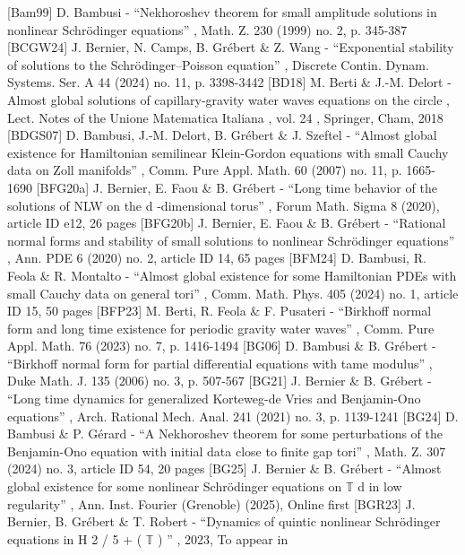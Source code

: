  [Bam99] D. Bambusi - “Nekhoroshev theorem for small amplitude solutions in nonlinear Schrödinger equations” , Math. Z. 230 (1999) no. 2, p. 345-387
 [BCGW24] J. Bernier, N. Camps, B. Grébert \& Z. Wang - “Exponential stability of solutions to the Schrödinger–Poisson equation” , Discrete Contin. Dynam. Systems. Ser. A 44 (2024) no. 11, p. 3398-3442
 [BD18] M. Berti \& J.-M. Delort - Almost global solutions of capillary-gravity water waves equations on the circle , Lect. Notes of the Unione Matematica Italiana , vol. 24 , Springer, Cham, 2018
 [BDGS07] D. Bambusi, J.-M. Delort, B. Grébert \& J. Szeftel - “Almost global existence for Hamiltonian semilinear Klein-Gordon equations with small Cauchy data on Zoll manifolds” , Comm. Pure Appl. Math. 60 (2007) no. 11, p. 1665-1690
 [BFG20a] J. Bernier, E. Faou \& B. Grébert - “Long time behavior of the solutions of NLW on the d -dimensional torus” , Forum Math. Sigma 8 (2020), article ID e12, 26 pages
 [BFG20b] J. Bernier, E. Faou \& B. Grébert - “Rational normal forms and stability of small solutions to nonlinear Schrödinger equations” , Ann. PDE 6 (2020) no. 2, article ID 14, 65 pages
 [BFM24] D. Bambusi, R. Feola \& R. Montalto - “Almost global existence for some Hamiltonian PDEs with small Cauchy data on general tori” , Comm. Math. Phys. 405 (2024) no. 1, article ID 15, 50 pages
 [BFP23] M. Berti, R. Feola \& F. Pusateri - “Birkhoff normal form and long time existence for periodic gravity water waves” , Comm. Pure Appl. Math. 76 (2023) no. 7, p. 1416-1494
 [BG06] D. Bambusi \& B. Grébert - “Birkhoff normal form for partial differential equations with tame modulus” , Duke Math. J. 135 (2006) no. 3, p. 507-567
 [BG21] J. Bernier \& B. Grébert - “Long time dynamics for generalized Korteweg-de Vries and Benjamin-Ono equations” , Arch. Rational Mech. Anal. 241 (2021) no. 3, p. 1139-1241
 [BG24] D. Bambusi \& P. Gérard - “A Nekhoroshev theorem for some perturbations of the Benjamin-Ono equation with initial data close to finite gap tori” , Math. Z. 307 (2024) no. 3, article ID 54, 20 pages
 [BG25] J. Bernier \& B. Grébert - “Almost global existence for some nonlinear Schrödinger equations on $\mathbb{T}$ d in low regularity” , Ann. Inst. Fourier (Grenoble) (2025), Online first
 [BGR23] J. Bernier, B. Grébert \& T. Robert - “Dynamics of quintic nonlinear Schrödinger equations in H 2 / 5 + ( $\mathbb{T}$ ) ” , 2023, To appear in
